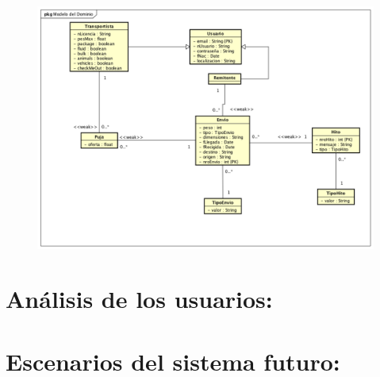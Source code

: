 \documentclass[10pt, a4paper,spanish]{article}
\begin{document}
		\begin{figure}[H]
			\centering
				\includegraphics[width=\textwidth]{astah/entidad_relacion.png}
		\end{figure}


	\section{Análisis de los usuarios:}

		\paragraph{}


	\section{Escenarios del sistema futuro:}

		\paragraph{}
\end{document}
